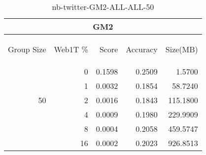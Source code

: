 \begin{center}
\begin{table}[htbp]
\begin{tabular}{ | r | r | r | r | r |}
\hline
\multicolumn{5}{|c|}{GM2}\\
\hline
\begin{sideways}Group Size\end{sideways} & \begin{sideways}Web1T \%\end{sideways} & \begin{sideways}Score\end{sideways} & \begin{sideways}Accuracy\end{sideways} & \begin{sideways}Size(MB)\end{sideways}\\
\hline
\multirow{5}{*}{50}
 & 0 & 0.1598 & 0.2509 & 1.5700\\ \cline{2-5}
 & 1 & 0.0032 & 0.1854 & 58.7240\\ \cline{2-5}
 & 2 & 0.0016 & 0.1843 & 115.1800\\ \cline{2-5}
 & 4 & 0.0009 & 0.1980 & 229.9909\\ \cline{2-5}
 & 8 & 0.0004 & 0.2058 & 459.5747\\ \cline{2-5}
 & 16 & 0.0002 & 0.2023 & 926.8513\\ \cline{2-5}
\hline
\end{tabular}
\caption{nb-twitter-GM2-ALL-ALL-50}
\label{table:nb-twitter-GM2-ALL-ALL-50}
\end{table}
\end{center}

